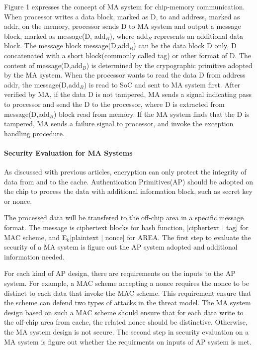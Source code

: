 \documentclass{article}
\begin{document}
Figure 1 expresses the concept of MA system for chip-memory communication. 
When processor writes a data block, marked as D, to and address, marked as addr, on the memory, processor sends D to MA system and output a message block, marked as message(D, add$_B$), where add$_B$ represents an additional data block. The message block message(D,add$_B$) can be the data block D only, D concatenated with a short block(commonly called tag) or other format of D. The content of message(D,add$_B$) is determined by the crypographic primitive adopted by the MA system.
When the processor wants to read the data D from address addr, the message(D,add$_B$) is read to SoC and sent to MA system first. After verified by MA, if the data D is not tampered, MA sends a signal indicating pass to processor and send the D to the processor, where D is extracted from message(D,add$_B$) block read from memory.
If the MA system finds that the D is tampered, MA sends a failure signal to processor, and invoke the exception handling procedure.

\paragraph{Security Evaluation for MA Systems}
As discussed with previous articles, encryption can only protect the integrity of data from and to the cache. Authentication Primitives(AP) should be adopted on the chip to process the data with additional information block, such as secret key or nonce. 

The processed data will be transfered to the off-chip area in a specific message format. The message is ciphertext blocks for hash function, [ciphertext $\mid$ tag] for MAC scheme, and E$_k$[plaintext $\mid$ nonce] for AREA. The first step to evaluate the security of a MA system is figure out the AP system adopted and additional information needed. 

For each kind of AP design, there are requirements on the inputs to the AP system. For example, a MAC scheme accepting a nonce requires the nonce to be distinct to each data that invoke the MAC scheme. This requirement ensure that the scheme can defend two types of attacks in the threat model. The MA system design based on such a MAC scheme should ensure that for each data write to the off-chip area from cache, the related nonce should be distinctive. Otherwise, the MA system design is not secure. The second step in security evaluation on a MA system is figure out whether the requirments on inputs of AP system is met.
\end{document}
